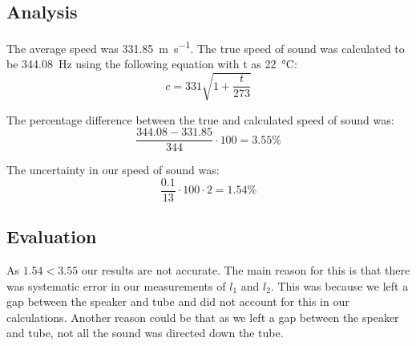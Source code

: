 \subsection{Analysis}
The average speed was \SI{331.85}{\metre\per\second}. The true speed of sound was calculated to be \SI{344.08}{\hertz} using the following equation with t as \SI{22}{\celsius}:
\begin{equation*}
  c = 331 \sqrt{1 + \frac{t}{273}}
\end{equation*}

The percentage difference between the true and calculated speed of sound was:
\begin{equation*}
  \frac{344.08-331.85}{344} \cdot 100 = 3.55 \%
\end{equation*}

The uncertainty in our speed of sound was:
\begin{equation*}
  \frac{0.1}{13} \cdot 100 \cdot 2 = 1.54\%
\end{equation*}

\subsection{Evaluation}
As $1.54<3.55$ our results are not accurate.
The main reason for this is that there was systematic error in our measurements of $l_1$ and $l_2$.
This was because we left a gap between the speaker and tube and did not account for this in our calculations.
Another reason could be that as we left a gap between the speaker and tube, not all the sound was directed down the tube.